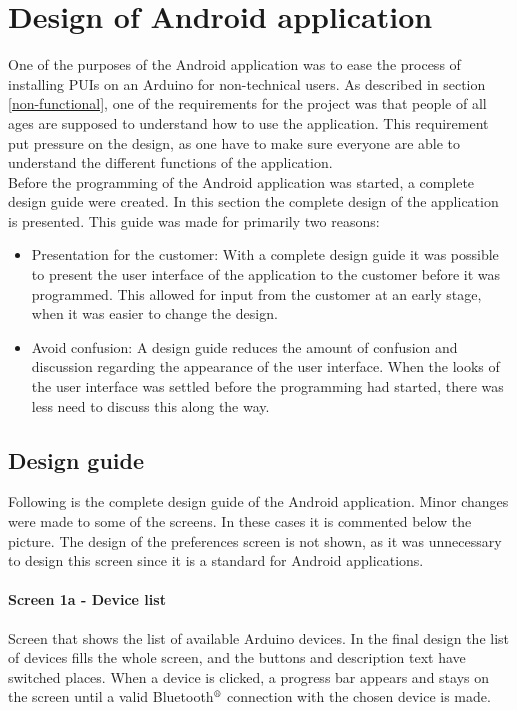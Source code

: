 \section{Design of Android application}
One of the purposes of the Android application was to ease the process of installing PUIs on an Arduino for non-technical users. As described in section \ref{non-functional}, one of the requirements for the project was that people of all ages are supposed to understand how to use the application. This requirement put pressure on the design, as one have to make sure everyone are able to understand the different functions of the application. \\
\newline
Before the programming of the Android application was started, a complete design guide were created. In this section the complete design of the application is presented. This guide was made for primarily two reasons:
\begin{itemize}
	\item{Presentation for the customer:} With a complete design guide it was possible to present the user interface of the application to the customer before it was programmed. This allowed for input from the customer at an early stage, when it was easier to change the design.
	\item{Avoid confusion:} A design guide reduces the amount of confusion and discussion regarding the appearance of the user interface. When the looks of the user interface was settled before the programming had started, there was less need to discuss this along the way.
\end{itemize}

\subsection{Design guide}
Following is the complete design guide of the Android application. Minor changes were made to some of the screens. In these cases it is commented below the picture. The design of the preferences screen is not shown, as it was unnecessary to design this screen since it is a standard for Android applications.

\paragraph{Screen 1a - Device list}
Screen that shows the list of available Arduino devices. In the final design the list of devices fills the whole screen, and the buttons and description text have switched places. When a device is clicked, a progress bar appears and stays on the screen until a valid Bluetooth$\textsuperscript{\textregistered}$ connection with the chosen device is made.

